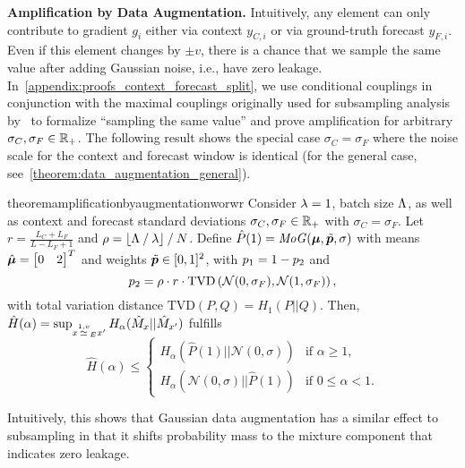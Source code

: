 \textbf{Amplification by Data Augmentation.}
Intuitively, any element can only contribute to gradient $g_i$ either via context $y_{C,i}$ or via ground-truth forecast $y_{F,i}$. Even if this element changes by $\pm v$, there is a chance that we sample the same value after adding Gaussian noise, i.e., have zero leakage. 
In~\cref{appendix:proofs_context_forecast_split}, we use conditional couplings in conjunction with the maximal couplings originally used for subsampling analysis by~\citet{balle2018privacy}
to formalize ``sampling the same value'' and prove amplification for arbitrary $\sigma_C, \sigma_F \in {\mathbb{R}}_+$.
The following result shows the special case $\sigma_C = \sigma_F$ where the noise scale for the context and forecast window is identical 
(for the general case, see~\cref{theorem:data_augmentation_general}).
\begin{restatable}{theorem}{amplificationbyaugmentationworwr}\label{theorem:amplification_by_data_augmentation_wor_wr}
    Consider $\lambda = 1$, 
    batch size $\Lambda$, as well as context and forecast standard deviations $\sigma_C, \sigma_F \in {\mathbb{R}}_+$ with $\sigma_C = \sigma_F$.
    Let $r = \frac{L_C + L_F}{L - L_F + 1}$ and  
    $\rho = \lfloor \Lambda \mathbin{/} \lambda \rfloor \mathbin{/} N$.
    Define
    $\hat{P}(1) = \mathit{MoG}({\bm{\mu}}, \tilde{{\bm{p}}}, \sigma)$ with
    means
     $\hat{{\bm{\mu}}} = \begin{bmatrix}
        0 & 2
    \end{bmatrix}^T$ and weights
     $\tilde{{\bm{p}}} \in [0,1]^2$, 
     with ${p}_1 = 1 - {p}_2$ and
     \begin{equation*}
         {p}_2 = \rho \cdot r \cdot \mathrm{TVD}\left(\mathcal{N}(0,\sigma_F), \mathcal{N}(1,\sigma_F)\right),
     \end{equation*}
     with total variation distance $\mathrm{TVD}(P,Q) = H_1(P || Q)$.
    Then, $\hat{H}(\alpha) = \sup_{x \overset{1,v}{\simeq}_{E} x'} H_\alpha(\hat{M}_x || \hat{M}_{x'})$ fulfills 
    \begin{equation*}
        \hat{H}(\alpha) \leq 
        \begin{cases}
            H_\alpha(\hat{P}(1) || \mathcal{N}(0,\sigma)) & \text{if } \alpha \geq 1,\\
            H_\alpha(\mathcal{N}(0,\sigma) || \hat{P}(1)) & \text{if } 0 \leq \alpha < 1.
        \end{cases}
    \end{equation*}
\end{restatable}
Intuitively, this shows that Gaussian data augmentation has a similar effect to subsampling in that it shifts probability mass to the mixture component that indicates zero leakage.

